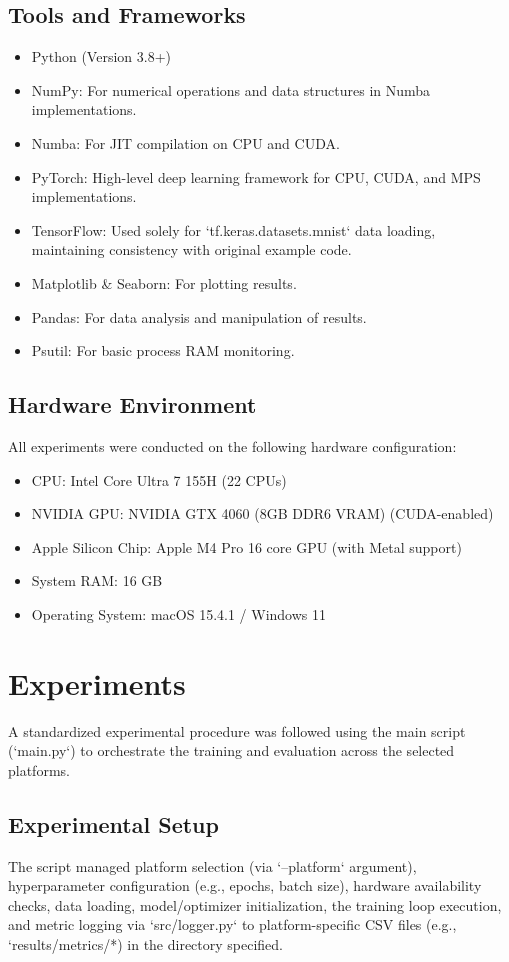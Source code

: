 \documentclass[conference]{IEEEtran} %
\begin{document}
\subsection{Tools and Frameworks}
\begin{itemize}
    \item Python (Version 3.8+)
    \item NumPy: For numerical operations and data structures in Numba implementations.
    \item Numba: For JIT compilation on CPU and CUDA.
    \item PyTorch: High-level deep learning framework for CPU, CUDA, and MPS implementations.
    \item TensorFlow: Used solely for `tf.keras.datasets.mnist` data loading, maintaining consistency with original example code.
    \item Matplotlib \& Seaborn: For plotting results.
    \item Pandas: For data analysis and manipulation of results.
    \item Psutil: For basic process RAM monitoring.
\end{itemize}

\subsection{Hardware Environment}
All experiments were conducted on the following hardware configuration:
\begin{itemize}
    \item CPU: Intel Core Ultra 7 155H (22 CPUs)
    \item NVIDIA GPU: NVIDIA GTX 4060 (8GB DDR6 VRAM) (CUDA-enabled)
    \item Apple Silicon Chip: Apple M4 Pro 16 core GPU (with Metal support)
    \item System RAM: 16 GB
    \item Operating System: macOS 15.4.1 / Windows 11
\end{itemize}

\section{Experiments}
\label{sec:experiments}
A standardized experimental procedure was followed using the main script (`main.py`) to orchestrate the training and evaluation across the selected platforms.

\subsection{Experimental Setup}
The script managed platform selection (via `--platform` argument), hyperparameter configuration (e.g., epochs, batch size), hardware availability checks, data loading, model/optimizer initialization, the training loop execution, and metric logging via `src/logger.py` to platform-specific CSV files (e.g., `results/metrics/*) in the directory specified.
\end{document}
